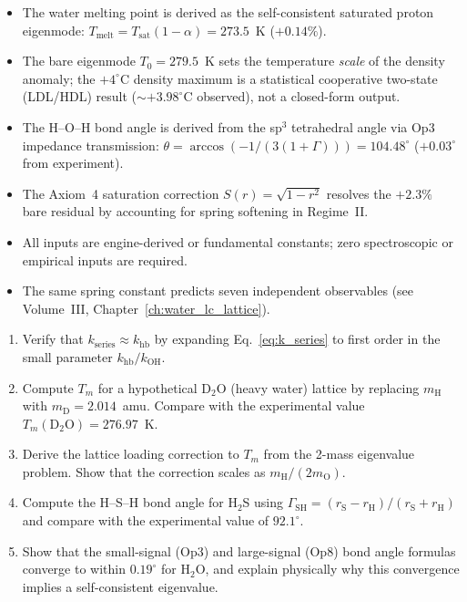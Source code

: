 \begin{summarybox}
\begin{itemize}
  \item The water melting point is derived as the self-consistent saturated proton 
        eigenmode: $T_\text{melt} = T_\text{sat}(1-\alpha) = 273.5$~K ($+0.14\%$).
  \item The bare eigenmode $T_0 = 279.5$~K sets the temperature \emph{scale} of the
        density anomaly; the $+4^{\circ}$C density maximum is a statistical cooperative
        two-state (LDL/HDL) result ($\sim +3.98^{\circ}$C observed), not a closed-form output.
  \item The H--O--H bond angle is derived from the sp$^3$ tetrahedral angle 
        via Op3 impedance transmission: $\theta = \arccos(-1/(3(1+\Gamma))) = 104.48^{\circ}$
        ($+0.03^{\circ}$ from experiment).
  \item The Axiom~4 saturation correction $S(r) = \sqrt{1-r^2}$ resolves the 
        $+2.3\%$ bare residual by accounting for spring softening in Regime~II.
  \item All inputs are engine-derived or fundamental constants; zero spectroscopic 
        or empirical inputs are required.
  \item The same spring constant predicts seven independent observables 
        (see Volume~III, Chapter~\ref{ch:water_lc_lattice}).
\end{itemize}
\end{summarybox}

\begin{exercisebox}
\begin{enumerate}
  \item Verify that $k_\text{series} \approx k_\text{hb}$ by expanding 
        Eq.~\eqref{eq:k_series} to first order in the small parameter 
        $k_\text{hb}/k_\text{OH}$.
  \item Compute $T_m$ for a hypothetical D$_2$O (heavy water) lattice by replacing 
        $m_\text{H}$ with $m_\text{D} = 2.014$~amu. Compare with the experimental 
        value $T_m(\text{D}_2\text{O}) = 276.97$~K.
  \item Derive the lattice loading correction to $T_m$ from the 2-mass eigenvalue 
        problem. Show that the correction scales as $m_\text{H}/(2m_\text{O})$.
  \item Compute the H--S--H bond angle for H$_2$S using $\Gamma_\text{SH} = 
        (r_\text{S} - r_\text{H})/(r_\text{S} + r_\text{H})$ and compare with the 
        experimental value of $92.1^{\circ}$.
  \item Show that the small-signal (Op3) and large-signal (Op8) bond angle 
        formulas converge to within $0.19^{\circ}$ for H$_2$O, and explain 
        physically why this convergence implies a self-consistent eigenvalue.
\end{enumerate}
\end{exercisebox}

